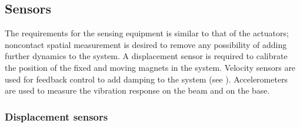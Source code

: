 \subsection{Sensors}

The requirements for the sensing equipment is similar to that of the actuators; noncontact spatial measurement is desired to remove any possibility of adding further dynamics to the system.
A displacement sensor is required to calibrate the position of the fixed and moving magnets in the system.
Velocity sensors are used for feedback control to add damping to the system (see ).
Accelerometers are used to measure the vibration response on the beam and on the base.

\subsubsection{Displacement sensors}

